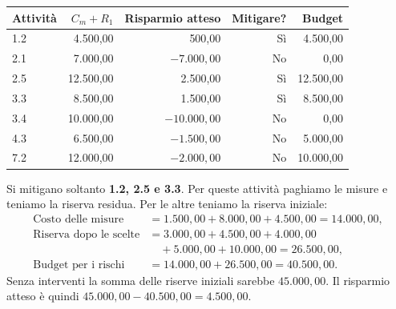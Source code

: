 \begin{center}
    \small
    \begin{tabular}{lrrrr}
        \hline
        Attività & $C_m+R_1$ & Risparmio atteso & Mitigare? & Budget \\
        \hline
        1.2 & 4.500,00 & 500,00 & Sì & 4.500,00 \\
        2.1 & 7.000,00 & $-7.000{,}00$ & No & 0,00 \\
        2.5 & 12.500,00 & 2.500,00 & Sì & 12.500,00 \\
        3.3 & 8.500,00 & 1.500,00 & Sì & 8.500,00 \\
        3.4 & 10.000,00 & $-10.000{,}00$ & No & 0,00 \\
        4.3 & 6.500,00 & $-1.500{,}00$ & No & 5.000,00 \\
        7.2 & 12.000,00 & $-2.000{,}00$ & No & 10.000,00 \\
        \hline
    \end{tabular}
\end{center}

\noindent Si mitigano soltanto \textbf{1.2, 2.5 e 3.3}.
Per queste attività paghiamo le misure e teniamo la riserva residua.
Per le altre teniamo la riserva iniziale:
\begin{align*}
    \text{Costo delle misure}
        &= 1.500{,}00 + 8.000{,}00 + 4.500{,}00 = 14.000{,}00, \\
    \text{Riserva dopo le scelte}
        &= 3.000{,}00 + 4.500{,}00 + 4.000{,}00 \\
        &\quad {}+ 5.000{,}00 + 10.000{,}00 = 26.500{,}00, \\
    \text{Budget per i rischi}
        &= 14.000{,}00 + 26.500{,}00 = 40.500{,}00.
\end{align*}
\noindent Senza interventi la somma delle riserve iniziali sarebbe
$45.000{,}00$. Il risparmio atteso è quindi
$45.000{,}00 - 40.500{,}00 = \boxed{4.500{,}00}$.
